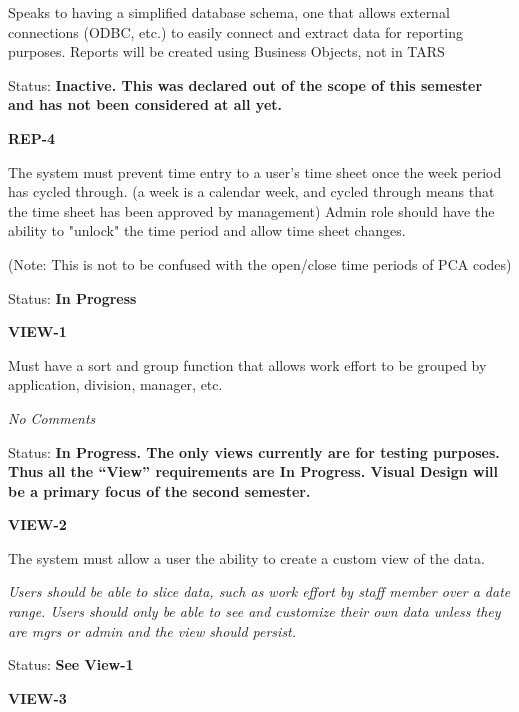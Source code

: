 \noindent Speaks to having a simplified database schema, one that allows external connections (ODBC, etc.) to easily connect and extract data for reporting purposes. Reports will be created using Business Objects, not in TARS

\noindent Status: \textbf{Inactive.   This was declared out of the scope of this semester and has not been considered at all yet.}\\

\noindent 

\noindent \textbf{REP-4}

\noindent The system must prevent time entry to a user's time sheet once the week period has cycled through. (a week is a calendar week, and cycled through means that the time sheet has been approved by management)  Admin role should have the ability to "unlock" the time period and allow time sheet changes.
	
\noindent(Note: This is not to be confused with the open/close time periods of PCA codes)

\noindent Status: \textbf{In Progress}\\

\noindent

\noindent \textbf{VIEW-1}

\noindent Must have a sort and group function that allows work effort to be grouped by application, division, manager, etc.

 \textit{No Comments}

\noindent Status: \textbf{In Progress.  The only views currently are for testing purposes.  Thus all the ``View'' requirements are In Progress.  Visual Design will be a primary focus of the second semester.}\textit{ }\\

\noindent \textit{}

\noindent \textbf{VIEW-2}

\noindent The system must allow a user the ability to create a custom view of the data.

\noindent \textit{Users should be able to slice data, such as work effort by staff member over a date range. Users should only be able to see and customize their own data unless they are mgrs or admin and the view should persist.}

Status: \textbf{See View-1}\\

\noindent 

\noindent \textbf{VIEW-3}

